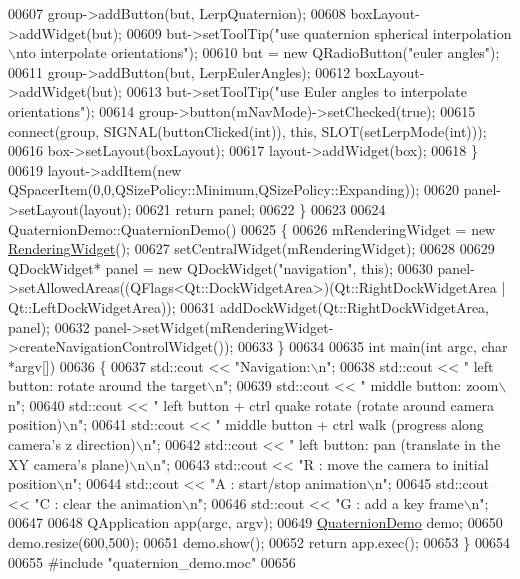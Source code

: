 \begin{DoxyCode}
00607     group->addButton(but, LerpQuaternion);
00608     boxLayout->addWidget(but);
00609     but->setToolTip(\textcolor{stringliteral}{"use quaternion spherical interpolation\(\backslash\)nto interpolate orientations"});
00610     but = \textcolor{keyword}{new} QRadioButton(\textcolor{stringliteral}{"euler angles"});
00611     group->addButton(but, LerpEulerAngles);
00612     boxLayout->addWidget(but);
00613     but->setToolTip(\textcolor{stringliteral}{"use Euler angles to interpolate orientations"});
00614     group->button(mNavMode)->setChecked(\textcolor{keyword}{true});
00615     connect(group, SIGNAL(buttonClicked(\textcolor{keywordtype}{int})), \textcolor{keyword}{this}, SLOT(setLerpMode(\textcolor{keywordtype}{int})));
00616     box->setLayout(boxLayout);
00617     layout->addWidget(box);
00618   \}
00619   layout->addItem(\textcolor{keyword}{new} QSpacerItem(0,0,QSizePolicy::Minimum,QSizePolicy::Expanding));
00620   panel->setLayout(layout);
00621   \textcolor{keywordflow}{return} panel;
00622 \}
00623 
00624 QuaternionDemo::QuaternionDemo()
00625 \{
00626   mRenderingWidget = \textcolor{keyword}{new} \hyperlink{class_rendering_widget}{RenderingWidget}();
00627   setCentralWidget(mRenderingWidget);
00628 
00629   QDockWidget* panel = \textcolor{keyword}{new} QDockWidget(\textcolor{stringliteral}{"navigation"}, \textcolor{keyword}{this});
00630   panel->setAllowedAreas((QFlags<Qt::DockWidgetArea>)(Qt::RightDockWidgetArea | Qt::LeftDockWidgetArea));
00631   addDockWidget(Qt::RightDockWidgetArea, panel);
00632   panel->setWidget(mRenderingWidget->createNavigationControlWidget());
00633 \}
00634 
00635 \textcolor{keywordtype}{int} main(\textcolor{keywordtype}{int} argc, \textcolor{keywordtype}{char} *argv[])
00636 \{
00637   std::cout << \textcolor{stringliteral}{"Navigation:\(\backslash\)n"};
00638   std::cout << \textcolor{stringliteral}{"  left button:           rotate around the target\(\backslash\)n"};
00639   std::cout << \textcolor{stringliteral}{"  middle button:         zoom\(\backslash\)n"};
00640   std::cout << \textcolor{stringliteral}{"  left button + ctrl     quake rotate (rotate around camera position)\(\backslash\)n"};
00641   std::cout << \textcolor{stringliteral}{"  middle button + ctrl   walk (progress along camera's z direction)\(\backslash\)n"};
00642   std::cout << \textcolor{stringliteral}{"  left button:           pan (translate in the XY camera's plane)\(\backslash\)n\(\backslash\)n"};
00643   std::cout << \textcolor{stringliteral}{"R : move the camera to initial position\(\backslash\)n"};
00644   std::cout << \textcolor{stringliteral}{"A : start/stop animation\(\backslash\)n"};
00645   std::cout << \textcolor{stringliteral}{"C : clear the animation\(\backslash\)n"};
00646   std::cout << \textcolor{stringliteral}{"G : add a key frame\(\backslash\)n"};
00647 
00648   QApplication app(argc, argv);
00649   \hyperlink{class_quaternion_demo}{QuaternionDemo} demo;
00650   demo.resize(600,500);
00651   demo.show();
00652   \textcolor{keywordflow}{return} app.exec();
00653 \}
00654 
00655 \textcolor{preprocessor}{#include "quaternion\_demo.moc"}
00656 
\end{DoxyCode}
